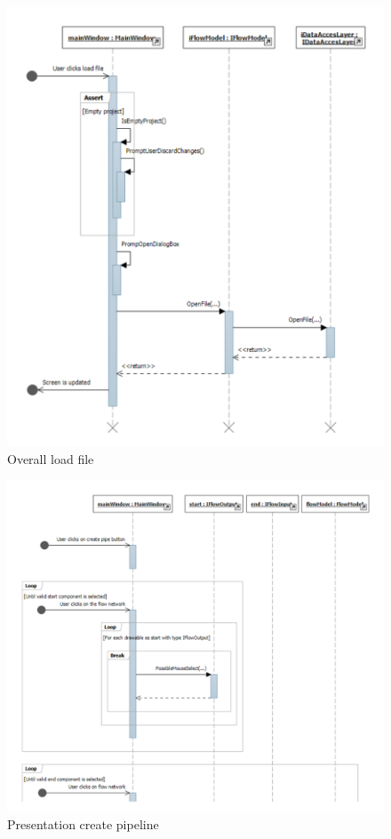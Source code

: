 \begin{figure}[h!]
	\centering
	\includegraphics[width=\textwidth]{figures/OverallLoadFile.pdf}
	\caption{Overall load file}
	\label{fig:seqoverall}
\end{figure}

\begin{figure}
	\centering
	\includegraphics[width=\textwidth]{figures/PresentationCreateConnection1.pdf}
	\caption{Presentation create pipeline}
	\label{fig:seqprespipe}
\end{figure}

